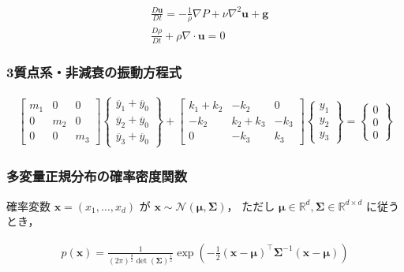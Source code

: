 \documentclass[11pt,a4j,onecolumn]{jsreport} %
\begin{document}
\begin{align}
  &\frac{D{\bm u}}{Dt} = - \frac{1}{\rho} \nabla P + \nu \nabla^2 {\bm u} + {\bm g} \label{eq:Navier_stokes} \\
  &\frac{D\rho}{Dt} + \rho \nabla \cdot {\bm u} = 0 \label{eq:continuity}
\end{align}

\subsubsection{3質点系・非減衰の振動方程式}

\begin{align}
  \label{eq:3mass_point}
  \begin{bmatrix}
    m_1 & 0 & 0 \\ 0 & m_2 & 0 \\ 0 & 0 & m_3
  \end{bmatrix} \begin{Bmatrix}
    \ddot{y_1} + \ddot{y_0} \\ \ddot{y_2} + \ddot{y_0} \\ \ddot{y_3} + \ddot{y_0}
  \end{Bmatrix} + \begin{bmatrix}
    k_1 + k_2 & -k_2 & 0 \\ -k_2 & k_2 + k_3 & -k_3 \\ 0 & -k_3 & k_3
  \end{bmatrix} \begin{Bmatrix}
    y_1 \\ y_2 \\ y_3
  \end{Bmatrix} = \begin{Bmatrix}
    0 \\ 0 \\ 0
  \end{Bmatrix}
\end{align}

\subsubsection{多変量正規分布の確率密度関数}

確率変数 ${\bm x} = (x_1, \dots, x_d)$ が ${\bm x} \sim \mathcal{N}({\bm \mu}, {\bm \Sigma})$，
ただし ${\bm \mu} \in \mathbb{R}^d, {\bm \Sigma} \in \mathbb{R}^{d \times d}$ に従うとき，

\begin{align}
  \label{eq:multi_norm}
  p({\bm x}) = \frac{1}{(2\pi)^{\frac{d}{2}} \det({\bm \Sigma})^{\frac{1}{2}}} 
  \exp \left(-\frac{1}{2} ({\bm x} - {\bm \mu})^\top {\bm \Sigma}^{-1} ({\bm x} - {\bm \mu}) \right)
\end{align}
\end{document}
